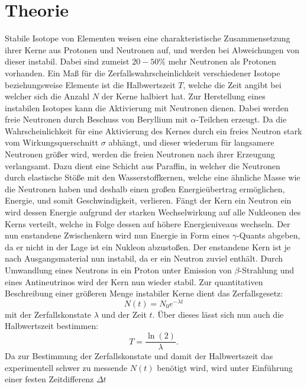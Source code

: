 \section{Theorie}
\label{sec:Theorie}
Stabile Isotope von Elementen weisen eine charakteristische Zusammensetzung ihrer Kerne aus Protonen und Neutronen auf, und werden bei Abweichungen von dieser instabil.
Dabei sind zumeist $20-50 \si{\percent}$ mehr Neutronen als Protonen vorhanden. Ein Maß für die Zerfallswahrscheinlichkeit verschiedener Isotope beziehungsweise Elemente ist
die Halbwertszeit $T$, welche die Zeit angibt bei welcher sich die Anzahl $N$ der Kerne halbiert hat. Zur Herstellung eines instabilen Isotopes kann die Aktivierung mit Neutronen
dienen. Dabei werden freie Neutronen durch Beschuss von Beryllium mit $\alpha$-Teilchen erzeugt. Da die Wahrscheinlichkeit für eine Aktivierung des Kernes durch ein freies Neutron
stark vom Wirkungsquerschnitt $\sigma$ abhängt, und dieser wiederum für langsamere Neutronen größer wird, werden die freien Neutronen nach ihrer Erzeugung verlangsamt.
Dazu dient eine Schicht aus Paraffin, in welcher die Neutronen durch elastische Stöße mit den Wasserstoffkernen, welche eine ähnliche Masse wie die Neutronen haben und deshalb
einen großen Energieübertrag ermöglichen, Energie, und somit Geschwindigkeit, verlieren.
Fängt der Kern ein Neutron ein wird dessen Energie aufgrund der starken Wechselwirkung auf alle Nukleonen des Kerns verteilt, welche in Folge dessen auf höhere Energieniveaus wechseln.
Der nun enstandene Zwischenkern wird nun Energie in Form eines $\gamma$-Quants abgeben, da er nicht in der Lage ist ein Nukleon abzustoßen. Der enstandene Kern ist je nach
Ausgangsmaterial nun instabil, da er ein Neutron zuviel enthält. Durch Umwandlung eines Neutrons in ein Proton unter Emission von $\beta$-Strahlung und eines Antineutrinos wird der
Kern nun wieder stabil. Zur quantitativen Beschreibung einer größeren Menge instabiler Kerne dient das Zerfallsgesetz:
\begin{equation}
  N(t)= N_0 e^{- \lambda t}
  \label{eqn:Zerfallsgesetz}
\end{equation}
mit der Zerfallskonstate $\lambda$ und der Zeit $t$. Über dieses lässt sich nun auch die Halbwertszeit bestimmen:
\begin{equation}
  T=\frac{\ln(2)}{\lambda}.
  \label{eqn:Halbwertszeit}
\end{equation}
Da zur Bestimmung der Zerfallskonstate und damit der Halbwertszeit das experimentell schwer zu messende $N(t)$ benötigt wird, wird unter Einführung einer festen Zeitdifferenz $\Delta t$
